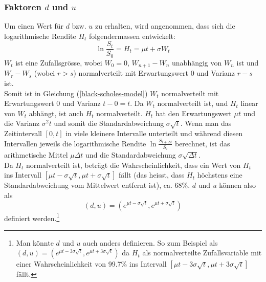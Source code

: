 \documentclass[11pt]{report} %
\begin{document}
\subsubsection{Faktoren $d$ und $u$}
Um einen Wert für $d$ bzw. $u$ zu erhalten, wird angenommen, dass sich die logarithmische Rendite $H_t$ folgendermassen entwickelt:
\begin{equation}\label{black-scholes-model}
    \ln{\frac{S_t}{S_0}}=H_t=\mu t + \sigma W_t
\end{equation}
$W_t$ ist eine Zufallsgrösse\label{brwn-motion}, wobei $W_0=0$, $W_{n+1}-W_n$ unabhängig von $W_{n}$ ist und $W_r-W_s$ (wobei $r>s$) normalverteilt mit Erwartungswert 0 und Varianz $r-s$ ist.\\Somit ist in Gleichung (\ref{black-scholes-model}) $W_t$ normalverteilt mit Erwartungswert 0 und Varianz $t-0=t$. Da $W_t$ normalverteilt ist, und $H_t$ linear von $W_t$ abhängt, ist auch $H_t$ normalverteilt. $H_t$ hat den Erwartungswert $\mu t$ und die Varianz $\sigma^2t$ und somit die Standardabweichung $\sigma \sqrt{t}$. Wenn man das Zeitintervall $[0, t]$ in viele kleinere Intervalle unterteilt und während diesen Intervallen jeweils die logarithmische Rendite $\ln{\frac{S_{i+\Delta t}}{S_i}}$ berechnet, ist das arithmetische Mittel $\mu \Delta t$ und die Standardabweichung $\sigma\sqrt{\Delta t}$.\\Da $H_t$ normalverteilt ist, beträgt die Wahrscheinlichkeit, dass ein Wert von $H_t$ ins Intervall $[\mu t -\sigma \sqrt{t}, \mu t + \sigma \sqrt{t}]$ fällt (das heisst, dass $H_t$ höchstens eine Standardabweichung vom Mittelwert entfernt ist), ca. 68\%. $d$ und $u$ können also als $$(d, u)=(e^{\mu t -\sigma \sqrt{t}}, e^{\mu t + \sigma \sqrt{t}})$$ definiert werden.\footnote{Man könnte $d$ und $u$ auch anders definieren. So zum Beispiel als $(d, u)=(e^{\mu t -3\sigma\sqrt{t}}, e^{\mu t + 3\sigma\sqrt{t}})$ da $H_t$ als normalverteilte Zufallsvariable mit einer Wahrscheinlichkeit von 99.7\% ins Intervall $[\mu t -3\sigma \sqrt{t}, \mu t + 3\sigma \sqrt{t}]$ fällt.} 
\end{document}
